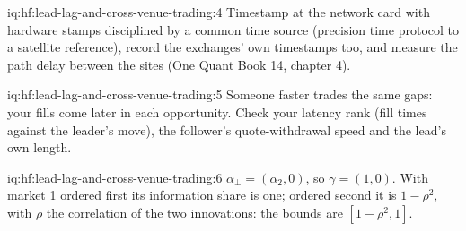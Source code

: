 \begin{solution}{iq:hf:lead-lag-and-cross-venue-trading:4}
Timestamp at the network card with hardware stamps disciplined by a common time source (precision time protocol to a satellite reference), record the
exchanges' own timestamps too, and measure the path delay between the sites (One Quant Book 14, chapter 4).
\end{solution}

\begin{solution}{iq:hf:lead-lag-and-cross-venue-trading:5}
Someone faster trades the same gaps: your fills come later in each opportunity. Check your latency rank (fill times against the leader's move), the
follower's quote-withdrawal speed and the lead's own length.
\end{solution}

\begin{solution}{iq:hf:lead-lag-and-cross-venue-trading:6}
$\alpha_\perp=(\alpha_2,0)$, so $\gamma=(1,0)$. With market 1 ordered first its information share is one; ordered second it is $1-\rho^2$, with $\rho$
the correlation of the two innovations: the bounds are $[1-\rho^2,1]$.
\end{solution}
